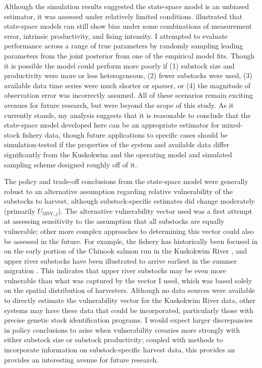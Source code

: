 \documentclass[12pt,]{book}
\theoremstyle{definition}
\theoremstyle{definition}
\theoremstyle{definition}
\theoremstyle{remark}
\begin{document}
Although the simulation results suggested the state-space model is an
unbiased estimator, it was assessed under relatively limited conditions.
\citet{su-peterman-2012} illustrated that state-space models can still
show bias under some combinations of measurement error, intrinsic
productivity, and fising intensity. I attempted to evaluate performance
across a range of true parameters by randomly sampling leading
parameters from the joint posterior from one of the empirical model
fits. Though it is possible the model could perform more poorly if (1)
substock size and productivity were more or less heterogeneous, (2)
fewer substocks were used, (3) available data time series were much
shorter or sparser, or (4) the magnitude of observation error was
incorrectly assumed. All of these scenarios remain exciting avenues for
future research, but were beyond the scope of this study. As it
currently stands, my analysis suggests that it is reasonable to conclude
that the state-space model developed here can be an appropriate
estimator for mixed-stock fishery data, though future applications to
specific cases should be simulation-tested if the properties of the
system and available data differ significantly from the Kuskokwim and
the operating model and simulated sampling scheme designed roughly off
of it.

The policy and trade-off conclusions from the state-space model were
generally robust to an alternative assumption regarding relative
vulnerability of the substocks to harvest, although substock-specific
estimates did change moderately (primarily \(U_{\text{MSY},j}\)). The
alternative vulnerability vector used was a first attempt at assessing
sensitivity to the assumption that all substocks are equally vulnerable;
other more complex approaches to determining this vector could also be
assessed in the future. For example, the fishery has historically been
focused in on the early portion of the Chinook salmon run in the
Kuskokwim River \citep{hamazaki-2008}, and upper river substocks have
been illustrated to arrive earliest in the summer migration
\citep{smith-liller-2017a, smith-liller-2017b}. This indicates that
upper river substocks may be even more vulnerable than what was captured
by the vector I used, which was based solely on the spatial distribution
of harvesters. Although no data sources were available to directly
estimate the vulnerability vector for the Kuskokwim River data, other
systems may have these data that could be incorporated, particularly
those with precise genetic stock identification programs. I would expect
larger discrepancies in policy conclusions to arise when vulnerability
covaries more strongly with either substock size or substock
productivity; coupled with methods to incorporate information on
substock-specific harvest data, this provides an provides an interesting
avenue for future research.
\end{document}

